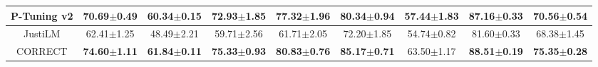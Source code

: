 \begin{table*}[t]
{\begin{tabular}{c|cc|cc|cc|cc}
                \hline
                P-Tuning v2 & 70.69$ \pm $0.49 & 60.34$ \pm $0.15 & 72.93$ \pm $1.85 & 77.32$ \pm $1.96 & 80.34$ \pm $0.94 & 57.44$ \pm $1.83 & 87.16$ \pm $0.33 & 70.56$ \pm $0.54 \\
                \hline
                JustiLM & 62.41$ \pm $1.25 & 48.49$ \pm $2.21 & 59.71$ \pm $2.56 & 61.71$ \pm $2.05 & 72.20$ \pm $1.85 & 54.74$ \pm $0.82 & 81.60$ \pm $0.33 & 68.38$ \pm $1.45 \\
                \hline
                CORRECT & \textbf{74.60}$ \pm $\textbf{1.11} & \textbf{61.84}$ \pm $\textbf{0.11} & \textbf{75.33}$ \pm $\textbf{0.93} & \textbf{80.83}$ \pm $\textbf{0.76} & \textbf{85.17}$ \pm $\textbf{0.71} & 63.50$ \pm $1.17 & \textbf{88.51}$ \pm $\textbf{0.19} & \textbf{75.35}$ \pm $\textbf{0.28} \\
			\bottomrule
		\end{tabular}
	}
	\label{table:fully_supervised_micro_f1}
\end{table*}

